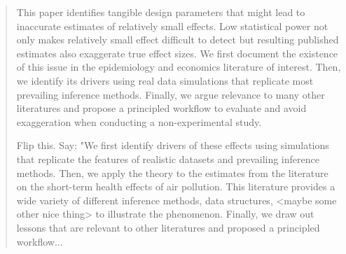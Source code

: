 \documentclass[12pt]{article}
\begin{document}
\begin{titlepage}
\begin{abstract}
\small
\noindent
This paper identifies tangible design parameters that might lead to inaccurate estimates of relatively small effects. Low statistical power not only makes relatively small effect difficult to detect but resulting published estimates also exaggerate true effect sizes. We first document the existence of this issue in the epidemiology and economics literature of interest. Then, we identify its drivers using real data simulations that replicate most prevailing inference methods. Finally, we argue relevance to many other literatures and propose a principled workflow to evaluate and avoid exaggeration when conducting a non-experimental study.

Flip this. Say: "We first identify drivers of these effects using simulations that replicate the features of realistic datasets and prevailing inference methods. Then, we apply the theory to the estimates from the literature on the short-term health effects of air pollution. This literature provides a wide variety of different inference methods, data structures, <maybe some other nice thing> to illustrate the phenomenon. Finally, we draw out lessons that are relevant to other literatures and proposed a principled workflow...



\end{abstract}
\end{titlepage}
\end{document}
